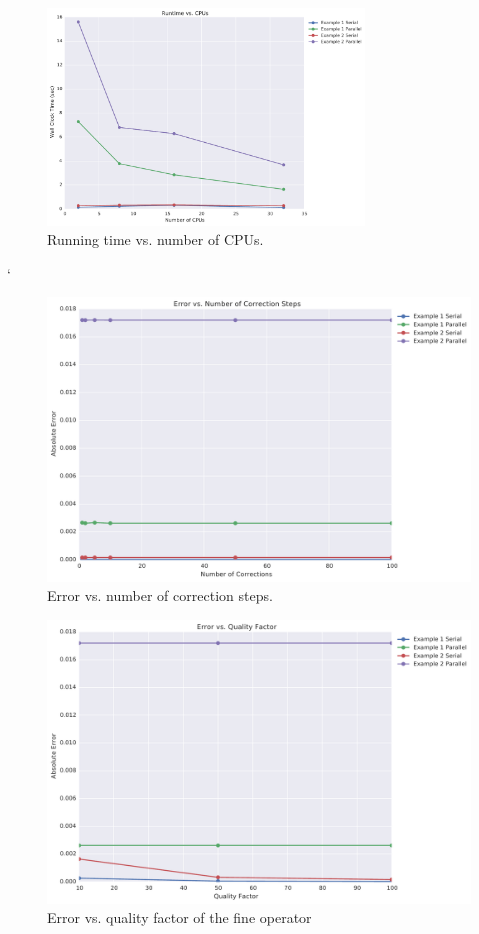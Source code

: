 \documentclass[letterpaper,12pt]{article}
\begin{document}
\begin{figure}
\begin{center}
\includegraphics[width=0.75\textwidth]{data/runtime_vs_cpus.pdf}
\caption{Running time vs. number of CPUs.}
\label{fig:run_v_cpu}
\end{center}
\end{figure}
`
\begin{figure}
\begin{center}
\includegraphics[width=0.75\linewidth]{data/error_vs_corrections.pdf}
\caption{Error vs. number of correction steps.}
\label{fig:err_v_k}
\end{center}
\end{figure}

\begin{figure}
\begin{center}
\includegraphics[width=0.75\linewidth]{data/error_vs_qualityfactor.pdf}
\caption{Error vs. quality factor of the fine operator}
\label{fig:err_v_q}
\end{center}
\end{figure}
\end{document}
